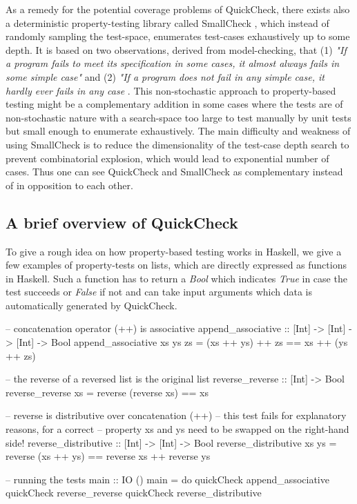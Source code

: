 \medskip

As a remedy for the potential coverage problems of QuickCheck, there exists also a deterministic property-testing library called SmallCheck \cite{runciman_smallcheck_2008}, which instead of randomly sampling the test-space, enumerates test-cases exhaustively up to some depth. It is based on two observations, derived from model-checking, that (1) \textit{"If a program fails to meet its specification in some cases, it almost always fails in some simple case"} and (2) \textit{"If a program does not fail in any simple case, it hardly ever fails in any case} \cite{runciman_smallcheck_2008}. This non-stochastic approach to property-based testing might be a complementary addition in some cases where the tests are of non-stochastic nature with a search-space  too large to test manually by unit tests but small enough to enumerate exhaustively. The main difficulty and weakness of using SmallCheck is to reduce the dimensionality of the test-case depth search to prevent combinatorial explosion, which would lead to exponential number of cases. Thus one can see QuickCheck and SmallCheck as complementary instead of in opposition to each other.

\subsection*{A brief overview of QuickCheck}
To give a rough idea on how property-based testing works in Haskell, we give a few examples of property-tests on lists, which are directly expressed as functions in Haskell. Such a function has to return a \textit{Bool} which indicates \textit{True} in case the test succeeds or \textit{False} if not and can take input arguments which data is automatically generated by QuickCheck.

\begin{HaskellCode}
-- concatenation operator (++) is associative
append_associative :: [Int] -> [Int] -> [Int] -> Bool
append_associative xs ys zs = (xs ++ ys) ++ zs == xs ++ (ys ++ zs)

-- the reverse of a reversed list is the original list
reverse_reverse :: [Int] -> Bool
reverse_reverse xs = reverse (reverse xs) == xs

-- reverse is distributive over concatenation (++)
-- this test fails for explanatory reasons, for a correct 
-- property xs and ys need to be swapped on the right-hand side!
reverse_distributive :: [Int] -> [Int] -> Bool
reverse_distributive xs ys = reverse (xs ++ ys) == reverse xs ++ reverse ys

-- running the tests
main :: IO ()
main = do
  quickCheck append_associative
  quickCheck reverse_reverse
  quickCheck reverse_distributive
\end{HaskellCode}

